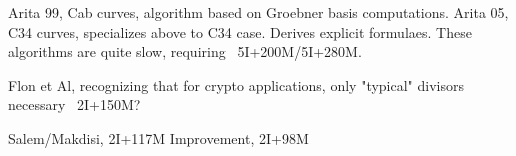 Arita 99, Cab curves, algorithm based on Groebner basis computations.
Arita 05, C34 curves, specializes above to C34 case. Derives explicit formulaes. These algorithms are quite slow, requiring ~5I+200M/5I+280M.

Flon et Al, recognizing that for crypto applications, only "typical" divisors necessary
~2I+150M?

Salem/Makdisi, 2I+117M
Improvement, 2I+98M




\begin{comment}
\section{Old Stuff}

\note{Generalizing Sato-Tate to higher genus curves requires Sato-Tate groups.
The theory is outside the scope of this thesis.}

A projective line over $\bb F_q$ has $q + 1$ rational points.
An elliptic curve over $\bb F_q$ has approximately as many rational points as does a line.
The actual number of rational points on an elliptic curve differs from that of the line by an error term
that is small compared to the size of the field $\bb F_q$.
The following theorem due to Hasse places bounds on this error term.
\begin{theorem}[Hasse's Theorem]
  Let $E$ be an elliptic curve over a finite field $\bb F_q$.
  The number of points on $E$ differs from $q + 1$ by at most $2 \sqrt q$.
  \[ | \#E(\bb F_q) - (q + 1) | \leq 2 \sqrt q \]
\end{theorem}

This theorem generalizes in the following way.
\begin{theorem}[Hasse-Weil Bound]
  Let $C$ be a curve of genus $g$ over a finite field $\bb F_q$.
  The number of points on $C$ differs from $q + 1$ by at most $2 g \sqrt q$.
  \[ | \#C(\bb F_q) - (q + 1) | \leq 2 g \sqrt q \]
\end{theorem}

Expressed differently, the Hasse-Weil Bound says that the quantity
\begin{equation}
  \frac {\#C(\bb F_q) - (q + 1)}{2 g \sqrt q}
\end{equation}
is between -1 and 1, so that for some angle $\theta_p$,
\begin{equation}
  \label{eq_sato_tate_ratio}
 \cos \theta_p = \frac {\#C(\bb F_q) - (q + 1)}{2 g \sqrt q}.
\end{equation}


\end{comment}
